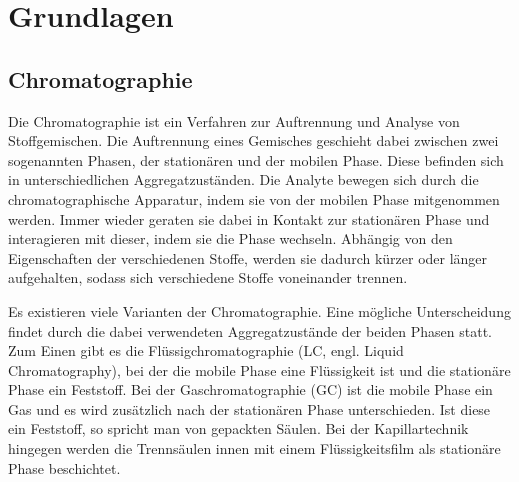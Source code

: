 
\chapter{Grundlagen}
\label{chapter:gru}

\section{Chromatographie}

Die Chromatographie ist ein Verfahren zur Auftrennung und Analyse von Stoffgemischen. Die Auftrennung eines Gemisches geschieht dabei zwischen zwei sogenannten Phasen, der stationären und der mobilen Phase. Diese befinden sich in unterschiedlichen Aggregatzuständen. 
Die Analyte bewegen sich durch die chromatographische Apparatur, indem sie von der mobilen Phase mitgenommen werden. Immer wieder geraten sie dabei in Kontakt zur stationären Phase und interagieren mit dieser, indem sie die Phase wechseln. Abhängig von den Eigenschaften der verschiedenen Stoffe, werden sie dadurch kürzer oder länger aufgehalten, sodass sich verschiedene Stoffe voneinander trennen.

Es existieren viele Varianten der Chromatographie. Eine mögliche Unterscheidung findet durch die dabei verwendeten Aggregatzustände der beiden Phasen statt. Zum Einen gibt es die Flüssigchromatographie (LC, engl. Liquid Chromatography),
bei der die mobile Phase eine Flüssigkeit ist und die stationäre Phase ein Feststoff. 
Bei der Gaschromatographie (GC) ist die mobile Phase ein Gas und es wird zusätzlich nach der stationären Phase unterschieden. Ist diese ein Feststoff, so spricht man von gepackten Säulen. Bei der Kapillartechnik hingegen werden die Trennsäulen innen mit einem Flüssigkeitsfilm als stationäre Phase beschichtet.




